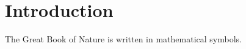\section{Introduction}
\begin{remark}
    The Great Book of Nature is written in mathematical symbols.
\end{remark}
